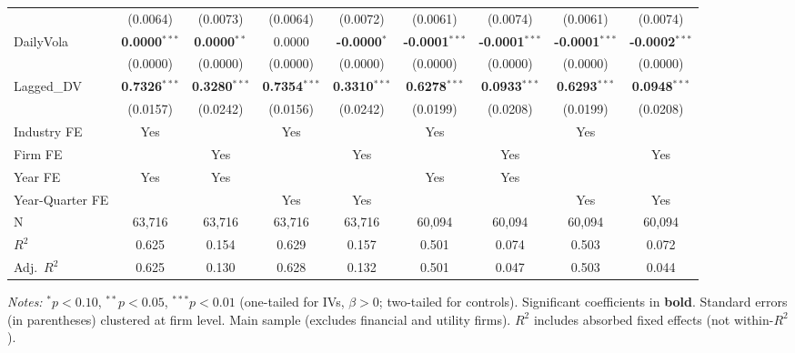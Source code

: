 \documentclass[11pt,a4paper]{article}
\begin{document}
\begin{table}[htbp]
\begin{tabular}{lcccccccc}
 & (0.0064) & (0.0073) & (0.0064) & (0.0072) & (0.0061) & (0.0074) & (0.0061) & (0.0074) \\
DailyVola & \textbf{0.0000}$^{***}$ & \textbf{0.0000}$^{**}$ & 0.0000 & \textbf{-0.0000}$^{*}$ & \textbf{-0.0001}$^{***}$ & \textbf{-0.0001}$^{***}$ & \textbf{-0.0001}$^{***}$ & \textbf{-0.0002}$^{***}$ \\
 & (0.0000) & (0.0000) & (0.0000) & (0.0000) & (0.0000) & (0.0000) & (0.0000) & (0.0000) \\
Lagged\_DV & \textbf{0.7326}$^{***}$ & \textbf{0.3280}$^{***}$ & \textbf{0.7354}$^{***}$ & \textbf{0.3310}$^{***}$ & \textbf{0.6278}$^{***}$ & \textbf{0.0933}$^{***}$ & \textbf{0.6293}$^{***}$ & \textbf{0.0948}$^{***}$ \\
 & (0.0157) & (0.0242) & (0.0156) & (0.0242) & (0.0199) & (0.0208) & (0.0199) & (0.0208) \\
\midrule
Industry FE & Yes &  & Yes &  & Yes &  & Yes &  \\
Firm FE &  & Yes &  & Yes &  & Yes &  & Yes \\
Year FE & Yes & Yes &  &  & Yes & Yes &  &  \\
Year-Quarter FE &  &  & Yes & Yes &  &  & Yes & Yes \\
\midrule
N & 63,716 & 63,716 & 63,716 & 63,716 & 60,094 & 60,094 & 60,094 & 60,094 \\
$R^2$ & 0.625 & 0.154 & 0.629 & 0.157 & 0.501 & 0.074 & 0.503 & 0.072 \\
Adj.~$R^2$ & 0.625 & 0.130 & 0.628 & 0.132 & 0.501 & 0.047 & 0.503 & 0.044 \\
\bottomrule
\end{tabular}
\begin{minipage}{\linewidth}
\vspace{2pt}\scriptsize
\textit{Notes:} $^{*}p<0.10$, $^{**}p<0.05$, $^{***}p<0.01$ (one-tailed for IVs, $\beta > 0$; two-tailed for controls).
 Significant coefficients in \textbf{bold}.
 Standard errors (in parentheses) clustered at firm level.
 Main sample (excludes financial and utility firms).
 $R^2$ includes absorbed fixed effects (not within-$R^2$).
\end{minipage}
\end{table}
\clearpage
\end{document}
